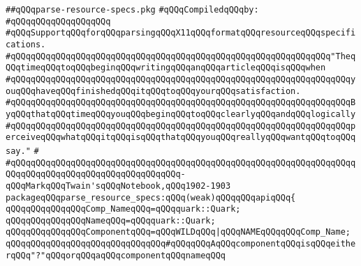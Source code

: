 \label{src/lib/x-kit/style/parse-resource-specs.pkg}
\verb|##qQQqparse-resource-specs.pkg|\newline
\newline
\verb|#qQQqCompiledqQQqby:|\newline
\verb|#qQQqqQQqqQQqqQQqqQQq|\newline
\newline
\newline
\verb|#qQQqSupportqQQqforqQQqparsingqQQqX11qQQqformatqQQqresourceqQQqspecifications.|\newline
\newline
\newline
\newline
\verb|#qQQqqQQqqQQqqQQqqQQqqQQqqQQqqQQqqQQqqQQqqQQqqQQqqQQqqQQqqQQqqQQq"TheqQQqtimeqQQqtoqQQqbeginqQQqwritingqQQqanqQQqarticleqQQqisqQQqwhen|\newline
\verb|#qQQqqQQqqQQqqQQqqQQqqQQqqQQqqQQqqQQqqQQqqQQqqQQqqQQqqQQqqQQqqQQqqQQqyouqQQqhaveqQQqfinishedqQQqitqQQqtoqQQqyourqQQqsatisfaction.|\newline
\verb|#qQQqqQQqqQQqqQQqqQQqqQQqqQQqqQQqqQQqqQQqqQQqqQQqqQQqqQQqqQQqqQQqqQQqByqQQqthatqQQqtimeqQQqyouqQQqbeginqQQqtoqQQqclearlyqQQqandqQQqlogically|\newline
\verb|#qQQqqQQqqQQqqQQqqQQqqQQqqQQqqQQqqQQqqQQqqQQqqQQqqQQqqQQqqQQqqQQqqQQqperceiveqQQqwhatqQQqitqQQqisqQQqthatqQQqyouqQQqreallyqQQqwantqQQqtoqQQqsay."|\newline
\verb|#|\newline
\verb|#qQQqqQQqqQQqqQQqqQQqqQQqqQQqqQQqqQQqqQQqqQQqqQQqqQQqqQQqqQQqqQQqqQQqqQQqqQQqqQQqqQQqqQQqqQQqqQQqqQQqqQQq-qQQqMarkqQQqTwain'sqQQqNotebook,qQQq1902-1903|\newline
\newline
\newline
\newline
\verb|packageqQQqparse_resource_specs:qQQq(weak)qQQqqQQqapiqQQq{|\newline
\newline
\verb|qQQqqQQqqQQqqQQqComp_NameqQQq=qQQqquark::Quark;|\newline
\verb|qQQqqQQqqQQqqQQqNameqQQq=qQQqquark::Quark;|\newline
\newline
\verb|qQQqqQQqqQQqqQQqComponentqQQq=qQQqWILDqQQq|\verb#|qQQqNAMEqQQqqQQqComp_Name;#\newline
\verb|qQQqqQQqqQQqqQQqqQQqqQQqqQQqqQQq#qQQqqQQqAqQQqcomponentqQQqisqQQqeitherqQQq"?"qQQqorqQQqaqQQqcomponentqQQqnameqQQq|\newline
